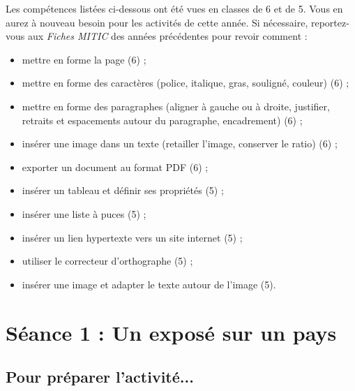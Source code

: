 
Les compétences listées ci-dessous ont été vues en classes de 6 et de 5. Vous en aurez à nouveau besoin pour les activités de cette année. Si nécessaire, reportez-vous aux \emph{Fiches MITIC} des années précédentes pour revoir comment :  

\begin{itemize}
\item mettre en forme la page (6) ;
\item mettre en forme des caractères (police, italique, gras, souligné, couleur) (6) ;
\item mettre en forme des paragraphes (aligner à gauche ou à droite, justifier, retraits et espacements autour du paragraphe, encadrement) (6) ;
\item insérer une image dans un texte (retailler l'image, conserver le ratio) (6) ;
\item exporter un document au format PDF (6) ;
\item insérer un tableau et définir ses propriétés (5) ;
\item insérer une liste à puces (5) ;
\item insérer un lien hypertexte vers un site internet (5) ;
\item utiliser le correcteur d'orthographe (5) ;
\item insérer une image et adapter le texte autour de l'image (5).
\end{itemize}





%
%
%
%


\section{Séance 1 : Un exposé sur un pays}\label{ficheTexte4e2}

\subsection{Pour préparer l'activité...}

